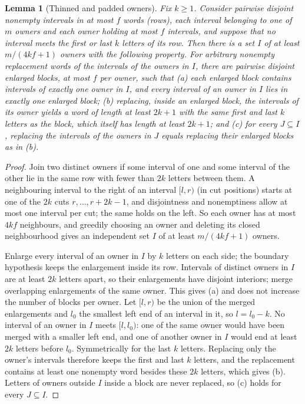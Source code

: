 \documentclass[11pt]{article}
\numberwithin{equation}{section}
\theoremstyle{plain}
\newtheorem{lemma}[theorem]{Lemma}
\theoremstyle{definition}
\theoremstyle{remark}
\begin{document}
\begin{lemma}[Thinned and padded owners]
\label{lem:lg-buffered-owners}
Fix $k\ge1$.  Consider pairwise disjoint nonempty intervals in at most $f$
words (\emph{rows}), each interval belonging to one of $m$ owners and each
owner holding at most $f$ intervals, and suppose that no interval meets the
first or last $k$ letters of its row.  Then there is a set $I$ of at least
$m/(4kf+1)$ owners with the following property.  For arbitrary nonempty
replacement words of the intervals of the owners in $I$, there are pairwise
disjoint \emph{enlarged blocks}, at most $f$ per owner, such that
\textup{(a)} each enlarged block contains intervals of exactly one owner in
$I$, and every interval of an owner in $I$ lies in exactly one enlarged
block; \textup{(b)} replacing, inside an enlarged block, the intervals of its
owner yields a word of length at least $2k+1$ with the same first and last
$k$ letters as the block, which itself has length at least $2k+1$; and
\textup{(c)} for every $J\subseteq I$, replacing the intervals of the owners
in $J$ equals replacing their enlarged blocks as in \textup{(b)}.
\end{lemma}

\begin{proof}
Join two distinct owners if some interval of one and some interval of the
other lie in the same row with fewer than $2k$ letters between them.  A
neighbouring interval to the right of an interval $[l,r)$ (in cut positions)
starts at one of the $2k$ cuts $r,\ldots,r+2k-1$, and disjointness and
nonemptiness allow at most one interval per cut; the same holds on the left.
So each owner has at most $4kf$ neighbours, and greedily choosing an owner and
deleting its closed neighbourhood gives an independent set $I$ of at least
$m/(4kf+1)$ owners.

Enlarge every interval of an owner in $I$ by $k$ letters on each side; the
boundary hypothesis keeps the enlargement inside its row.  Intervals of
distinct owners in $I$ are at least $2k$ letters apart, so their enlargements
have disjoint interiors; merge overlapping enlargements of the same owner.
This gives (a) and does not increase the number of blocks per owner.  Let
$[l,r)$ be the union of the merged enlargements and $l_0$ the smallest left end
of an interval in it, so $l=l_0-k$.  No interval of an owner in $I$ meets
$[l,l_0)$: one of the same owner would have been merged with a smaller left
end, and one of another owner in $I$ would end at least $2k$ letters before
$l_0$.  Symmetrically for the last $k$ letters.  Replacing only the owner's
intervals therefore keeps the first and last $k$ letters, and the replacement
contains at least one nonempty word besides these $2k$ letters, which gives
(b).  Letters of owners outside $I$ inside a block are never replaced, so
(c) holds for every $J\subseteq I$.
\end{proof}
\end{document}
